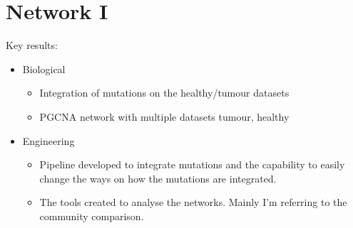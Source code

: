 \section{Network I}


Key results:
\begin{itemize}
    \item Biological
          \begin{itemize}
              \item Integration of mutations on the healthy/tumour datasets
              \item PGCNA network with multiple datasets tumour, healthy
          \end{itemize}
    \item Engineering
          \begin{itemize}
              \item Pipeline developed to integrate mutations and the capability to easily change the ways on how the mutations are integrated.
              \item The tools created to analyse the networks. Mainly I'm referring to the community comparison.
          \end{itemize}
\end{itemize}


